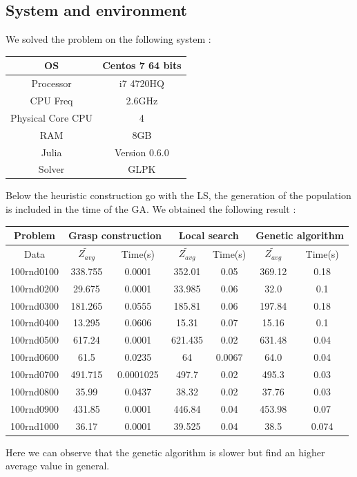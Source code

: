 \documentclass[12pt]{article}
\begin{document}
	\subsection{System and environment}
	We solved the problem on the following system :
	\begin{center}
		\begin{tabular}{|c|c|}
			\hline
			OS & Centos 7 64 bits \\
			\hline
			Processor & i7 4720HQ \\
			\hline
			CPU Freq & 2.6GHz \\
			\hline
			Physical Core CPU & 4 \\
			\hline
			RAM & 8GB \\
			\hline
			Julia & Version 0.6.0 \\
			\hline
			Solver & GLPK\\
			\hline
		\end{tabular}
	\end{center}

	Below the heuristic construction go with the LS, the generation of the population is included in the time of the GA.
	We obtained the following result :
	\begin{center}
		\begin{tabular}{|c|c|c|c|c|c|c|}
			\hline
			Problem  &\multicolumn{2}{|c|}{Grasp construction} & \multicolumn{2}{|c|}{Local search}& \multicolumn{2}{|c|}{Genetic algorithm}\\
			\hline
			Data  &  $\tilde{Z_{avg}}$ & Time(s) & $\tilde{Z_{avg}}$ & Time(s)& $\tilde{Z_{avg}}$ & Time(s) \\
			\hline
			100rnd0100  & 338.755 & 0.0001 &  352.01 & 0.05 & 369.12 & 0.18\\
			\hline
			100rnd0200  & 29.675  &  0.0001 &  33.985 & 0.06 & 32.0 & 0.1\\
			\hline
			100rnd0300  & 181.265   & 0.0555 & 185.81 & 0.06 &197.84 & 0.18\\
			\hline
			100rnd0400 & 13.295    & 0.0606 & 15.31 & 0.07 &15.16&0.1\\
			\hline
			
			100rnd0500  & 617.24     & 0.0001 & 621.435 & 0.02 & 631.48 & 0.04\\
			\hline
			
			100rnd0600  & 61.5     & 0.0235 & 64 & 0.0067 & 64.0 & 0.04\\
			\hline
			
			100rnd0700  & 491.715 & 0.0001025 & 497.7 & 0.02
			& 495.3 & 0.03\\
			\hline
			
			100rnd0800  & 35.99 & 0.0437 &38.32 & 0.02 &37.76& 0.03\\
			\hline
			
			100rnd0900  & 431.85     & 0.0001 & 446.84 & 0.04 &453.98&0.07\\
			\hline
			
			100rnd1000 & 36.17     & 0.0001 & 39.525 & 0.04 &38.5&0.074\\
			\hline
		\end{tabular}
	\end{center}
	Here we can observe that the genetic algorithm is slower but find an higher average value in general.
\end{document}
